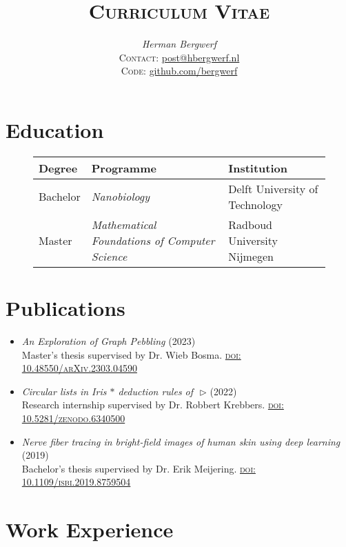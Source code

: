 \documentclass[a4paper,12pt]{article}
\date{}
\title{\textsc{Curriculum Vitae}}
\author{\emph{Herman Bergwerf}\\%
{\small \textsc{Contact:} \href{mailto:post@hbergwerf.nl}{post@hbergwerf.nl}}\\%
{\small \textsc{Code:} \href{https://github.com/bergwerf}{github.com/bergwerf}}}
\begin{document}
\maketitle

\section*{Education}

\begin{figure}[h]
\centering
\begin{tabular}{lll}
\toprule
{\bf Degree} & {\bf Programme} & {\bf Institution}\\
\midrule
Bachelor & \emph{Nanobiology} & Delft University of Technology\\
Master & \emph{Mathematical Foundations of Computer Science} & Radboud University Nijmegen\\
\bottomrule
\end{tabular}
\end{figure}

\section*{Publications}

\begin{itemize}[--,labelsep=3mm,leftmargin=*]
\item \emph{An Exploration of Graph Pebbling} (2023)\\
Master's thesis supervised by Dr. Wieb Bosma. \textsc{\href{https://arxiv.org/abs/2303.04590}{doi: 10.48550/arXiv.2303.04590}}
\item \emph{Circular lists in Iris $\ast$ deduction rules of~\,$\triangleright$} (2022)\\
Research internship supervised by Dr. Robbert Krebbers. \textsc{\href{https://doi.org/10.5281/zenodo.6340500}{doi: 10.5281/zenodo.6340500}}
\item \emph{Nerve fiber tracing in bright-field images of human skin using deep learning} (2019)\\
Bachelor's thesis supervised by Dr. Erik Meijering. \textsc{\href{https://ieeexplore.ieee.org/document/8759504}{doi: 10.1109/isbi.2019.8759504}}
\end{itemize}

\section*{Work Experience}
\end{document}
